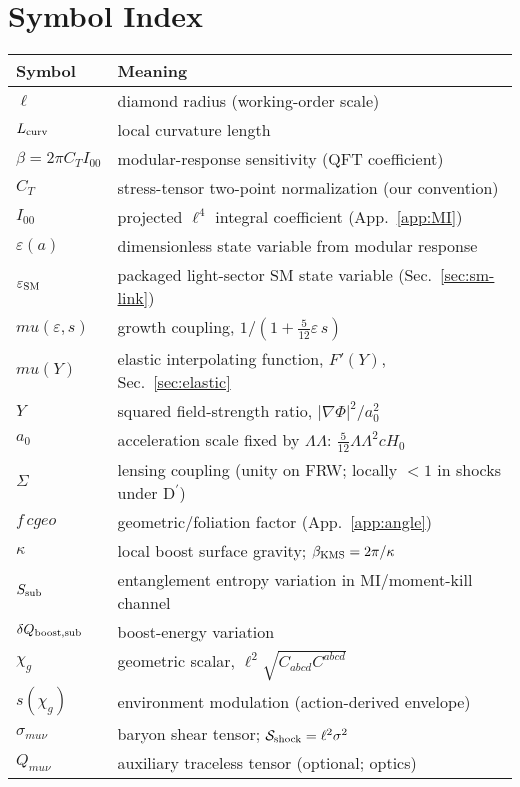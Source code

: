 \documentclass[aps,prd,onecolumn,superscriptaddress,nofootinbib]{revtex4-2}
\def\cgeo{cgeo}%
\def\mu{mu}%
\def\Omega_\Lambda{OmegaLambda}%
\providecommand{\cgeo}{c_{\rm geo}}
\begin{document}
\section*{Symbol Index}
\begin{tabular}{@{}ll@{}}
\toprule
Symbol & Meaning \\
\midrule
\(\ell\) & diamond radius (working-order scale) \\
\(L_{\rm curv}\) & local curvature length \\
\(\beta=2\pi C_T I_{00}\) & modular-response sensitivity (QFT coefficient) \\
\(C_T\) & stress-tensor two-point normalization (our convention) \\
\(I_{00}\) & projected \(\ell^4\) integral coefficient (App.~\ref{app:MI}) \\
\(\varepsilon(a)\) & dimensionless state variable from modular response \\
\(\varepsilon_{\rm SM}\) & packaged light-sector SM state variable (Sec.~\ref{sec:sm-link}) \\
\(\mu(\varepsilon,s)\) & growth coupling, \(1/(1+\tfrac{5}{12}\varepsilon\,s)\) \\
\(\mu(Y)\) & elastic interpolating function, \(F'(Y)\), Sec.~\ref{sec:elastic} \\
\(Y\) & squared field-strength ratio, \(|\nabla\Phi|^2/a_0^2\) \\
\(a_0\) & acceleration scale fixed by \(\Omega_\Lambda\): \(\frac{5}{12}\Omega_\Lambda^2 c H_0\) \\
\(\Sigma\) & lensing coupling (unity on FRW; locally $<\!1$ in shocks under D\(^{\prime}\)) \\
\(f\,\cgeo\) & geometric/foliation factor (App.~\ref{app:angle}) \\
\(\kappa\) & local boost surface gravity; \(\beta_{\rm KMS}=2\pi/\kappa\) \\
\(S_{\rm sub}\) & entanglement entropy variation in MI/moment-kill channel \\
\(\delta Q_{\rm boost,sub}\) & boost-energy variation \\
\(\chi_g\) & geometric scalar, \(\ell^2\sqrt{C_{abcd}C^{abcd}}\) \\
\(s(\chi_g)\) & environment modulation (action-derived envelope) \\
\(\sigma_{\mu\nu}\) & baryon shear tensor; \(\mathcal S_{\rm shock}=\ell^2\sigma^2\) \\
\(Q_{\mu\nu}\) & auxiliary traceless tensor (optional; optics) \\

\end{tabular}
\end{document}
